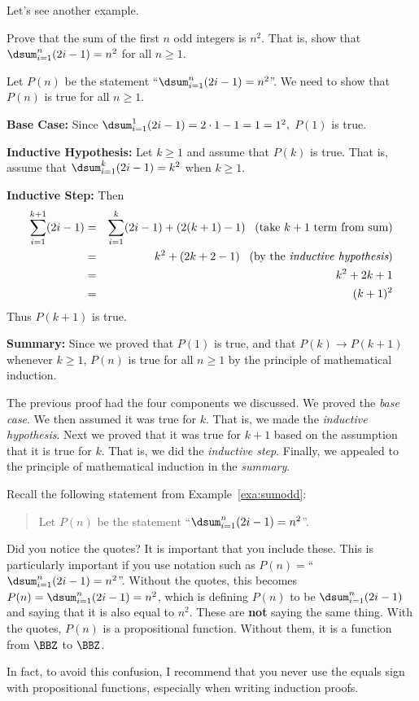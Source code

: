 Let's see another example. 



\begin{exa}\label{exa:sumodd}
Prove that the sum of the first $n$ odd integers is $n^2$. 
That is, show that 
$\dsum_{i=1}^{n}(2 i - 1) = n^2$ for all $n\geq 1$.
\begin{pf}
Let $P(n)$  be the statement  ``$\dsum_{i=1}^{n}(2 i - 1) = n^2$''.
We need to show that $P(n)$ is true for all $n\geq 1$.

\noindent
{\bf Base Case:} 
Since $\dsum_{i=1}^{1}(2 i - 1) = 2\cdot 1 - 1 = 1=1^2,$
$P(1)$ is true. 

\noindent
{\bf Inductive Hypothesis:}
Let $k\geq 1$ and assume that $P(k)$ is true.  That is,
assume that $\dsum_{i=1}^{k}(2 i - 1) = k^2$ when $k\geq 1$. \hfill 

\noindent
{\bf Inductive Step:} 
Then \hfill
\begin{eqnarray*}
\displaystyle \sum_{i=1}^{k+1} (2 i - 1)&=&
\displaystyle \sum_{i=1}^{k}( 2 i - 1)+ (2(k+1) - 1) \, \, \, 
\mbox{ (take }k+1\mbox{ term from sum)}\\
&=&k^2+(2k+2-1)\, \, \, 
\mbox{ (by the {\em inductive hypothesis})}\\
&=&k^2+2k+1\\
&=&(k+1)^2
\end{eqnarray*}
Thus $P(k+1)$ is true.

\noindent
{\bf Summary:}
Since we proved that $P(1)$ is true, and that $P(k)\rightarrow P(k+1)$ whenever $k\geq 1$,
$P(n)$ is true for all $n\geq 1$ by the principle of mathematical induction.
\end{pf}
\end{exa}

The previous proof had the four components we discussed.
We proved the {\em base case}.
We then assumed it was true for $k$.  That is, we made the {\em inductive hypothesis}.
Next we proved that it was true for $k+1$ based on the assumption that it is true for $k$.  
That is, we did the {\em inductive step}.
Finally, we appealed to the principle of mathematical induction in the {\em summary}.

\begin{rem}
Recall the following statement from 
 Example~\ref{exa:sumodd}:
\begin{quote}
Let $P(n)$  be the statement  ``$\dsum_{i=1}^{n}(2 i - 1) = n^2$''.
\end{quote} 
Did you notice the quotes?  
It is important that you include these.  This is particularly important if
you use notation such as  $P(n)=$``$\dsum_{i=1}^{n}(2 i - 1) = n^2$''.  Without the quotes, 
this becomes $P(n)=\dsum_{i=1}^{n}(2 i - 1) = n^2$, which is defining $P(n)$ to be $\dsum_{i=1}^{n}(2 i - 1)$
and saying that it is also equal to $n^2$.  These are {\bf not} saying the same thing.
With the quotes, $P(n)$ is a propositional function.  Without them, it is a function from
$\BBZ$ to $\BBZ$.

In fact, to avoid this confusion, I recommend that you never use the equals sign with propositional
functions, especially when writing induction proofs.
\end{rem}


